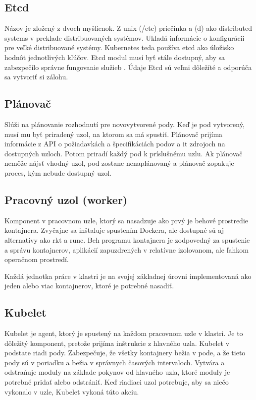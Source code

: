 \subsection*{Etcd}
Názov je zložený z dvoch myšlienok. Z unix (/etc) priečinka a (d) ako distributed systems v preklade distribuovaných systémov. Ukladá informácie o konfigurácii pre veľké distribuované systémy. Kubernetes teda používa etcd ako úložisko hodnôt jednotlivých kľúčov. Etcd modul musí byť stále dostupný, aby sa zabezpečilo správne fungovanie služieb \cite{etcd}. Údaje Etcd sú veľmi dôležíté a odporúča sa vytvoriť si zálohu.

\subsection*{Plánovač}
Slúži na plánovanie rozhodnutí pre novovytvorené pody. Keď je pod vytvorený, musí mu byť priradený uzol, na ktorom sa má spustiť. Plánovač prijíma informácie z API o požiadavkách a špecifikáciách podov a \acrshort{it} zdrojoch na dostupných uzloch. Potom priradí každý pod k príslušnému uzlu. Ak plánovač nemôže nájsť vhodný uzol, pod zostane nenaplánovaný a plánovač zopakuje proces, kým nebude dostupný uzol.

\subsection{Pracovný uzol (worker)}

Komponent v pracovnom uzle, ktorý sa nasadzuje ako prvý je behové prostredie kontajnera. Zvyčajne sa inštaluje spustením Dockera, ale dostupné sú aj alternatívy ako rkt a runc. Beh programu kontajnera je zodpovedný za spustenie a správu kontajnerov, aplikácií zapuzdrených v relatívne izolovanom, ale ľahkom operačnom prostredí.

Každá jednotka práce v klastri je na svojej základnej úrovni implementovaná ako jeden alebo viac kontajnerov, ktoré je potrebné nasadiť.

\subsection*{Kubelet}
Kubelet je agent, ktorý je spustený na každom pracovnom uzle v klastri. Je to dôležitý komponent, pretože prijíma inštrukcie z hlavného uzla. Kubelet v podstate riadi pody. Zabezpečuje, že všetky kontajnery bežia v pode, a že tieto pody sú v poriadku a bežia v správnych časových intervaloch. Vytvára a odstraňuje moduly na základe pokynov od hlavného uzla, ktoré moduly je potrebné pridať alebo odstrániť. Keď riadiaci uzol potrebuje, aby sa niečo vykonalo v uzle, Kubelet vykoná túto akciu.

